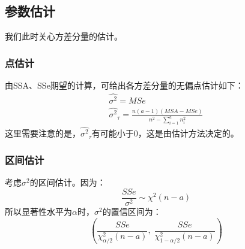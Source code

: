 \subsection{参数估计}
我们此时关心方差分量的估计。
\subsubsection{点估计}
由SSA、SSe期望的计算，可给出各方差分量的无偏点估计如下：
\begin{gather*}
	\hat{\sigma^2}=MSe \\
	\hat{\sigma^2}_\tau=\frac{n(a-1)(MSA-MSe)}{n^2-\sum\limits_{i=1}^an_i^2}
\end{gather*}
这里需要注意的是，$\hat{\sigma^2}_\tau$有可能小于$0$，这是由估计方法决定的。
\subsubsection{区间估计}
考虑$\sigma^2$的区间估计。因为：
\begin{equation*}
	\frac{SSe}{\sigma^2}\sim\chi^2(n-a)
\end{equation*}
所以显著性水平为$\alpha$时，$\sigma^2$的置信区间为：
\begin{equation*}
	\left(\frac{SSe}{\chi_{\alpha/2}^2(n-a)},\;\frac{SSe}{\chi_{1-\alpha/2}^2(n-a)}\right)
\end{equation*}
